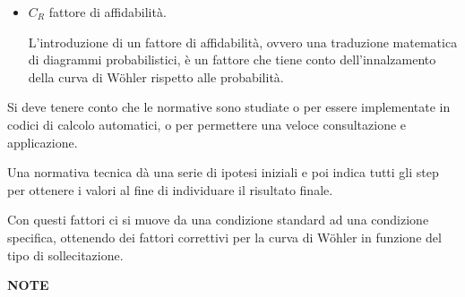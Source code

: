 \documentclass{article}
\begin{document}
\begin{adjustwidth}{2in}{}
\begin{itemize}
				\item $C_R$ fattore di affidabilità. 
				
				L'introduzione di un fattore di affidabilità, ovvero una traduzione matematica di diagrammi probabilistici, è un fattore che tiene conto dell'innalzamento della curva di Wöhler rispetto alle probabilità. 
				\end{itemize}
				
				Si deve tenere conto che le normative sono studiate o per essere implementate in codici di calcolo automatici, o per permettere una veloce consultazione e applicazione.
				
				Una normativa tecnica dà una serie di ipotesi iniziali e poi indica tutti gli step per ottenere i valori al fine di individuare il risultato finale. \newline
				
				Con questi fattori ci si muove da una condizione standard ad una condizione specifica, ottenendo dei fattori correttivi per la curva di Wöhler in funzione del tipo di sollecitazione.
				
 
			 
		
		
		
		
		
		
		 
		
		
		
		
	
 		
 		
 		
 		
 		
 		
 		
 		
	 	
	 	
	 	
	 	
	 	
	 	
	 	
		 
		 
		 
	\newpage
	{\Large \textbf{NOTE}}

		\end{adjustwidth}
\end{document}
